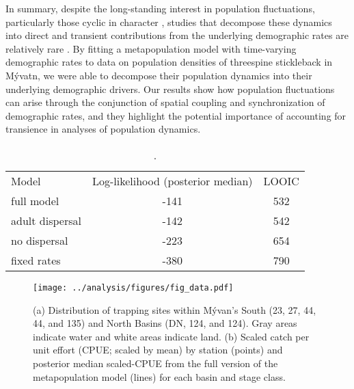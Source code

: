 \documentclass[11pt]{article}
\begin{document}
In summary, despite the long-standing interest in population fluctuations,
particularly those cyclic in character
\citep{elton1924, nicholson1935},
studies that decompose these dynamics into direct and transient contributions
from the underlying demographic rates are relatively rare
\citep{fox2000population, koons2017understanding, hoy2020fluctuations}.
By fitting a metapopulation model with time-varying demographic rates to
data on population densities of threespine stickleback in M\'{y}vatn,
we were able to decompose their population dynamics into their
underlying demographic drivers.
Our results show how population fluctuations can arise through the conjunction of
spatial coupling and synchronization of demographic rates,
and they highlight the potential importance
of accounting for transience in analyses of population dynamics.









\clearpage
\begin{table}
\caption{\label{tab:compare}
.
}
\setlength{\tabcolsep}{12pt}
\begin{tabular}{lcc}
\toprule
Model                  &    Log-likelihood (posterior median) & LOOIC \\
\cmidrule{1-3}
full model             & -141 & 532 \\
adult dispersal        & -142 & 542 \\
no dispersal           & -223 & 654 \\
fixed rates            & -380 & 790 \\
\bottomrule
\end{tabular}
\end{table}
\clearpage

\clearpage
\begin{figure}
\centering
\texttt{[image: ../analysis/figures/fig\_data.pdf]}
\caption{\label{fig:data}
(a) Distribution of trapping sites within M\'{y}van's
South (23, 27, 44, 44, and 135) and North Basins (DN, 124, and 124).
Gray areas indicate water and white areas indicate land.
(b) Scaled catch per unit effort (CPUE; scaled by mean) by station (points) and
posterior median scaled-CPUE from the full version of the metapopulation model (lines)
for each basin and stage class.
}
\end{figure}
\clearpage
\end{document}
